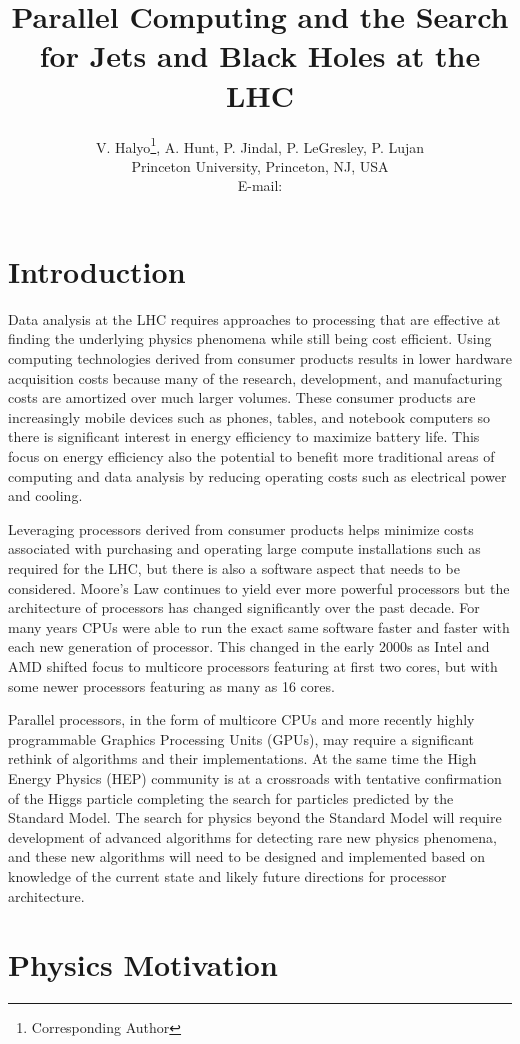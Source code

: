 \documentclass{JINST}
\title{Parallel Computing and the Search for Jets and Black Holes at the LHC}
\author{V. Halyo\thanks{Corresponding Author}, A. Hunt, P. Jindal, P. LeGresley, P. Lujan \\
\llap Princeton University, Princeton, NJ, USA \\
E-mail: \email{vhalyo@gmail.com}}
\begin{document}
\section{Introduction} 

Data analysis at the LHC requires approaches to processing that are effective at finding the underlying physics phenomena while still being cost efficient.  Using computing technologies derived from consumer products results in lower hardware acquisition costs because many of the research, development, and manufacturing costs are amortized over much larger volumes.  These consumer products are increasingly mobile devices such as phones, tables, and notebook computers so there is significant interest in energy efficiency to maximize battery life.  This focus on energy efficiency also the potential to benefit more traditional areas of computing and data analysis by reducing operating costs such as electrical power and cooling.

Leveraging processors derived from consumer products helps minimize costs associated with purchasing and operating large compute installations such as required for the LHC, but there is also a software aspect that needs to be considered.  Moore's Law continues to yield ever more powerful processors but the architecture of processors has changed significantly over the past decade.  For many years CPUs were able to run the exact same software faster and faster with each new generation of processor.  This changed in the early 2000s as Intel and AMD shifted focus to multicore processors featuring at first two cores, but with some newer processors featuring as many as 16 cores.

Parallel processors, in the form of multicore CPUs and more recently highly programmable Graphics Processing Units (GPUs), may require a significant rethink of algorithms and their implementations.  At the same time the High Energy Physics (HEP) community is at a crossroads with tentative confirmation of the Higgs particle completing the search for particles predicted by the Standard Model.  The search for physics beyond the Standard Model will require development of advanced algorithms for detecting rare new physics phenomena, and these new algorithms will need to be designed and implemented based on knowledge of the current state and likely future directions for processor architecture.

\section{Physics Motivation}
\end{document}
